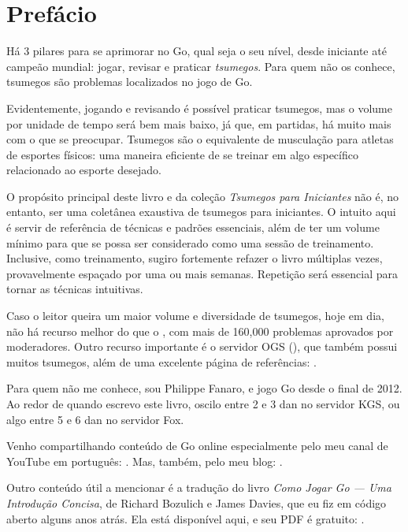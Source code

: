\chapter{Prefácio}

\small
  
Há 3 pilares para se aprimorar no Go, qual seja o seu nível, desde iniciante até campeão mundial: jogar, revisar e praticar \emph{tsumegos}. Para quem não os conhece, tsumegos são problemas localizados no jogo de Go.

Evidentemente, jogando e revisando é possível praticar tsumegos, mas o volume por unidade de tempo será bem mais baixo, já que, em partidas, há muito mais com o que se preocupar. Tsumegos são o equivalente de musculação para atletas de esportes físicos: uma maneira eficiente de se treinar em algo específico relacionado ao esporte desejado.

O propósito principal deste livro e da coleção \emph{Tsumegos para Iniciantes} não é, no entanto, ser uma coletânea exaustiva de tsumegos para iniciantes. O intuito aqui é servir de referência de técnicas e padrões essenciais, além de ter um volume mínimo para que se possa ser considerado como uma sessão de treinamento. Inclusive, como treinamento, sugiro fortemente refazer o livro múltiplas vezes, provavelmente espaçado por uma ou mais semanas. Repetição será essencial para tornar as técnicas intuitivas.

Caso o leitor queira um maior volume e diversidade de tsumegos, hoje em dia, não há recurso melhor do que o , com mais de 160,000 problemas aprovados por moderadores. Outro recurso importante é o servidor OGS (), que também possui muitos tsumegos, além de uma excelente página de referências: .

\bigskip

Para quem não me conhece, sou Philippe Fanaro, e jogo Go desde o final de 2012. Ao redor de quando escrevo este livro, oscilo entre 2 e 3 dan no servidor KGS, ou algo entre 5 e 6 dan no servidor Fox.

Venho compartilhando conteúdo de Go online especialmente pelo meu canal de YouTube em português: . Mas, também, pelo meu blog: .

Outro conteúdo útil a mencionar é a tradução do livro \emph{Como Jogar Go --- Uma Introdução Concisa}, de Richard Bozulich e James Davies, que eu fiz em código aberto alguns anos atrás. Ela está disponível aqui, e seu PDF é gratuito: .

